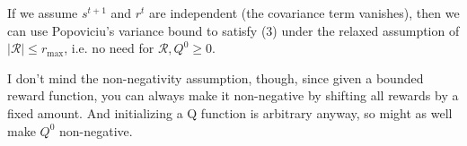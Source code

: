 \documentclass[twoside,10pt]{report}
\begin{document}
\begin{note}[]
If we assume $s^{t+1}$ and $r^{t}$ are independent (the covariance term vanishes), then we can use Popoviciu's variance bound to satisfy (3) under the relaxed assumption of $|\mathcal{R}| \leq r_{\text{max}}$, i.e. no need for $\mathcal{R}, Q^{0} \geq 0$.

I don't mind the non-negativity assumption, though, since given a bounded reward function, you can always make it non-negative by shifting all rewards by a fixed amount. And initializing a Q function is arbitrary anyway, so might as well make $Q^{0}$ non-negative.
\end{note}
\end{document}
